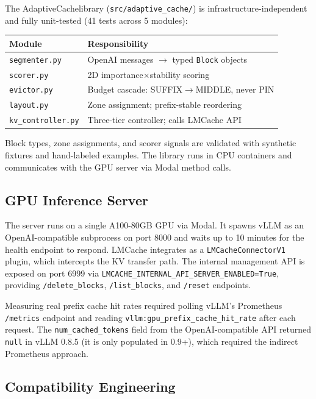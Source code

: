 \documentclass[letterpaper,twocolumn,10pt]{article}
\newcommand{\sysname}{AdaptiveCache}
\begin{document}
The \sysname library (\texttt{src/adaptive\_cache/}) is infrastructure-independent
and fully unit-tested (41 tests across 5 modules):

\begin{center}
\small\setlength{\tabcolsep}{4pt}
\begin{tabular}{ll}
\toprule
\textbf{Module} & \textbf{Responsibility} \\
\midrule
\texttt{segmenter.py} & OpenAI messages $\to$ typed \texttt{Block} objects \\
\texttt{scorer.py}    & 2D importance$\times$stability scoring \\
\texttt{evictor.py}   & Budget cascade: SUFFIX$\to$MIDDLE, never PIN \\
\texttt{layout.py}    & Zone assignment; prefix-stable reordering \\
\texttt{kv\_controller.py} & Three-tier controller; calls LMCache API \\
\bottomrule
\end{tabular}
\end{center}

Block types, zone assignments, and scorer signals are validated with synthetic
fixtures and hand-labeled examples. The library runs in CPU containers and
communicates with the GPU server via Modal method calls.

\subsection{GPU Inference Server}

The server runs on a single A100-80GB GPU via Modal. It spawns vLLM as an
OpenAI-compatible subprocess on port 8000 and
waits up to 10 minutes for the health endpoint to respond. LMCache integrates
as a \texttt{LMCacheConnectorV1} plugin, which intercepts the KV transfer
path. The internal management API is exposed on port 6999 via
\texttt{LMCACHE\_INTERNAL\_API\_SERVER\_ENABLED=True}, providing
\texttt{/delete\_blocks}, \texttt{/list\_blocks}, and \texttt{/reset}
endpoints.

Measuring real prefix cache hit rates required polling vLLM's Prometheus
\texttt{/metrics} endpoint and reading
\texttt{vllm:gpu\_prefix\_cache\_hit\_rate} after each request. The
\texttt{num\_cached\_tokens} field from the OpenAI-compatible API returned
\texttt{null} in vLLM 0.8.5 (it is only populated in 0.9+), which required
the indirect Prometheus approach.

\subsection{Compatibility Engineering}
\end{document}
